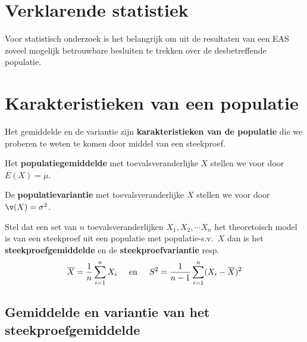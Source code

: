 \newpage
\section{Verklarende statistiek}

Voor statistisch onderzoek is het belangrijk om uit de resultaten van een EAS zoveel mogelijk betrouwbare besluiten te trekken over de desbetreffende  populatie.

\section{Karakteristieken van een populatie}

\begin{small}
\begin{description}
\item Het gemiddelde en de variantie zijn \textbf{karakteristieken van de populatie} die we proberen te weten te komen  door middel van een steekproef. 


\item Het \textbf{populatiegemiddelde} met toevalsveranderlijke $X$ stellen we voor door $E(X)=\mu$.
\item De \textbf{populatievariantie} met toevalsveranderlijke $X$  stellen we voor door $\v(X)=\sigma^2$.
\item 
Stel dat een set van $n$ toevalsveranderlijken $X_1, X_2, \cdots X_n$ het theoretoisch model is van een steekproef uit een populatie met populatie-s.v.\ $X$ dan is het \textbf{steekproefgemiddelde} en de \textbf{steekproefvariantie} resp.\:
$$\overline{X}=\frac{1}{n}\sum_{i=1}^nX_i\hspace{0,5cm}\mbox{en} \hspace{0,5cm}S^2=\frac{1}{n-1}\sum_{i=1}^n(X_i-\overline{X})^2$$
\end{description}
\end{small}


\subsection{Gemiddelde en variantie van het steekproefgemiddelde}

